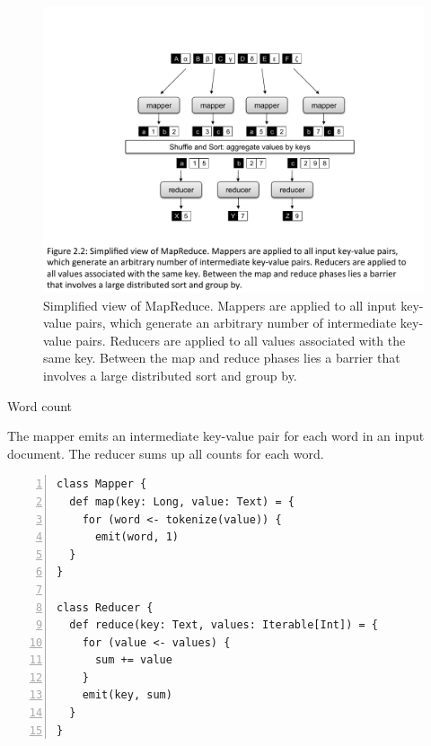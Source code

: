 \documentclass[11pt]{article}
\begin{document}
\begin{figure}
\begin{center}
\includegraphics[scale=0.6]{figures/fig-ch2-MapReduce-simple.pdf}
\end{center}
\caption{Simplified view of MapReduce.  Mappers are applied to all
  input key-value pairs, which generate an arbitrary number of
  intermediate key-value pairs.  Reducers are applied to all values
  associated with the same key.  Between the map and reduce phases
  lies a barrier that involves a large distributed sort and group by.}
\label{figure:chapter2:MapReduce-simple}
\end{figure}


\begin{algorithm}[t]
\caption{Word count}
\label{algorithm:chapter2:word-count:basic}
The mapper emits an intermediate key-value pair for each word in an
input document. The reducer sums up all counts for each word.
\begin{small}
\begin{Verbatim}[numbers=left, xleftmargin=7.5mm]
class Mapper {
  def map(key: Long, value: Text) = {
    for (word <- tokenize(value)) {
      emit(word, 1)
  }
}

class Reducer {
  def reduce(key: Text, values: Iterable[Int]) = {
    for (value <- values) {
      sum += value
    }
    emit(key, sum)
  }
}
\end{Verbatim}
\end{small}
\end{algorithm}
\end{document}
